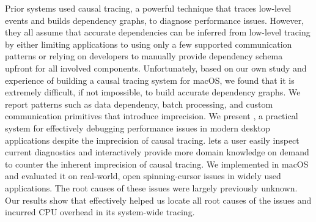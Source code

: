 Prior systems used causal tracing, a powerful technique that traces low-level
events and builds dependency graphs, to diagnose performance issues.  However,
they all assume that accurate dependencies can be inferred from low-level
tracing by either limiting applications to using only a few supported
communication patterns or relying on developers to manually provide dependency
schema upfront for all involved components.  Unfortunately, based on our own
study and experience of building a causal tracing system for macOS, we found
that it is extremely difficult, if not impossible, to build accurate dependency
graphs.  We report patterns such as data dependency, batch processing, and
custom communication primitives that introduce imprecision.  We present \xxx, a
practical system for effectively debugging performance issues in modern desktop
applications despite the imprecision of causal tracing.  \xxx lets a user
easily inspect current diagnostics and interactively provide more domain
knowledge on demand to counter the inherent imprecision of causal tracing.  We
implemented \xxx in macOS and evaluated it on \nbug real-world, open
spinning-cursor issues in widely used applications.  The root causes of these
issues were largely previously unknown.  Our results show that \xxx effectively
helped us locate all root causes of the issues and incurred \cpuoverhead CPU
overhead in its system-wide tracing.
